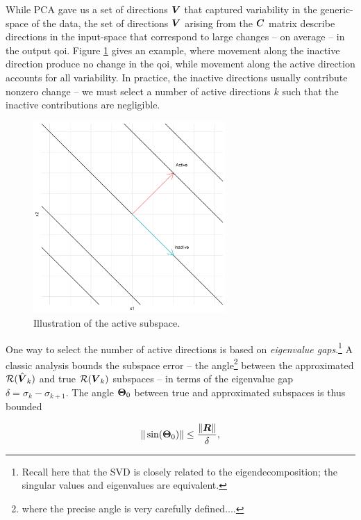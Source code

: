 \documentclass{article}
\begin{document}
While PCA gave us a set of directions $\boldsymbol{V}$ that captured variability in the
generic-space of the data, the set of directions $\boldsymbol{V}$ arising from the $\boldsymbol{C}$
matrix describe directions in the input-space that correspond to large changes
-- on average -- in the output qoi. Figure \ref{fig:as-contour} gives an
example, where movement along the inactive direction produce no change in the
qoi, while movement along the active direction accounts for all variability. In
practice, the inactive directions usually contribute nonzero change -- we must
select a number of active directions $k$ such that the inactive contributions
are negligible.

\begin{figure}[!ht]
  \centering
  \includegraphics[width=0.65\textwidth]{../../images/as_contour1}
  \caption{Illustration of the active subspace.}
  \label{fig:as-contour}
\end{figure}

One way to select the number of active directions is based on \emph{eigenvalue
  gaps}.\footnote{Recall here that the SVD is closely related to the
  eigendecomposition; the singular values and eigenvalues are equivalent.} A
classic analysis bounds the subspace error -- the angle\footnote{where the
  precise angle is very carefully defined....} between the approximated
$\mathcal{R}(\hat{\boldsymbol{V}}_k)$ and true $\mathcal{R}(\boldsymbol{V}_k)$ subspaces -- in terms of the eigenvalue
gap $\delta = \sigma_k - \sigma_{k+1}$.\cite{davis1970rotation} The angle
$\boldsymbol{\Theta}_0$ between true and approximated subspaces is thus bounded

\begin{equation} \label{eq:sine-bound}
  \|\sin(\boldsymbol{\Theta}_0)\| \leq \frac{\|\boldsymbol{R}\|}{\delta},
\end{equation}
\end{document}
